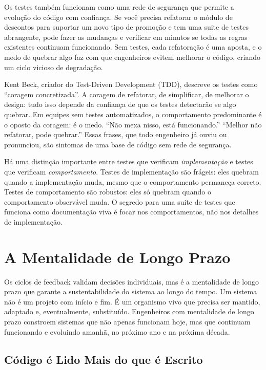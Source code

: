 Os testes também funcionam como uma rede de segurança que permite a
evolução do código com confiança. Se você precisa refatorar o módulo de
descontos para suportar um novo tipo de promoção e tem uma suite de
testes abrangente, pode fazer as mudanças e verificar em minutos se
todas as regras existentes continuam funcionando. Sem testes, cada
refatoração é uma aposta, e o medo de quebrar algo faz com que
engenheiros evitem melhorar o código, criando um ciclo vicioso de
degradação.

Kent Beck, criador do Test-Driven Development (TDD), descreve os testes
como ``coragem concretizada''. A coragem de refatorar, de simplificar,
de melhorar o design: tudo isso depende da confiança de que os testes
detectarão se algo quebrar. Em equipes sem testes automatizados, o
comportamento predominante é o oposto da coragem: é o medo. ``Não mexa
nisso, está funcionando.'' ``Melhor não refatorar, pode quebrar.'' Essas
frases, que todo engenheiro já ouviu ou pronunciou, são sintomas de uma
base de código sem rede de segurança.

Há uma distinção importante entre testes que verificam \emph{implementação}
e testes que verificam \emph{comportamento}. Testes de implementação são
frágeis: eles quebram quando a implementação muda, mesmo que o
comportamento permaneça correto. Testes de comportamento são robustos:
eles só quebram quando o comportamento observável muda. O segredo para
uma suite de testes que funciona como documentação viva é focar nos
comportamentos, não nos detalhes de implementação.

\section{A Mentalidade de Longo Prazo}

Os ciclos de feedback validam decisões individuais, mas é a mentalidade
de longo prazo que garante a sustentabilidade do sistema ao longo do
tempo. Um sistema não é um projeto com início e fim. É um organismo
vivo que precisa ser mantido, adaptado e, eventualmente, substituído.
Engenheiros com mentalidade de longo prazo constroem sistemas que não
apenas funcionam hoje, mas que continuam funcionando e evoluindo amanhã,
no próximo ano e na próxima década.

\subsection{Código é Lido Mais do que é Escrito}

